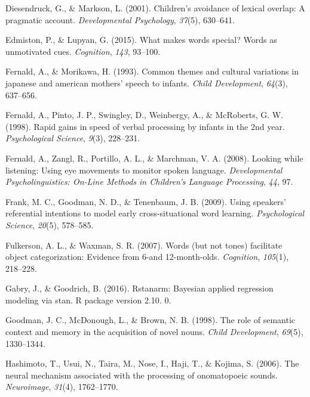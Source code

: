 \documentclass[english,floatsintext,man]{apa6}
\theoremstyle{definition}
\theoremstyle{definition}
\theoremstyle{definition}
\theoremstyle{remark}
\begin{document}
\leavevmode\hypertarget{ref-diesendruck2001children}{}%
Diesendruck, G., \& Markson, L. (2001). Children's avoidance of lexical
overlap: A pragmatic account. \emph{Developmental Psychology},
\emph{37}(5), 630--641.

\leavevmode\hypertarget{ref-edmiston2015makes}{}%
Edmiston, P., \& Lupyan, G. (2015). What makes words special? Words as
unmotivated cues. \emph{Cognition}, \emph{143}, 93--100.

\leavevmode\hypertarget{ref-fernald1993common}{}%
Fernald, A., \& Morikawa, H. (1993). Common themes and cultural
variations in japanese and american mothers' speech to infants.
\emph{Child Development}, \emph{64}(3), 637--656.

\leavevmode\hypertarget{ref-fernald1998rapid}{}%
Fernald, A., Pinto, J. P., Swingley, D., Weinbergy, A., \& McRoberts, G.
W. (1998). Rapid gains in speed of verbal processing by infants in the
2nd year. \emph{Psychological Science}, \emph{9}(3), 228--231.

\leavevmode\hypertarget{ref-fernald2008looking}{}%
Fernald, A., Zangl, R., Portillo, A. L., \& Marchman, V. A. (2008).
Looking while listening: Using eye movements to monitor spoken language.
\emph{Developmental Psycholinguistics: On-Line Methods in Children's
Language Processing}, \emph{44}, 97.

\leavevmode\hypertarget{ref-frank2009using}{}%
Frank, M. C., Goodman, N. D., \& Tenenbaum, J. B. (2009). Using
speakers' referential intentions to model early cross-situational word
learning. \emph{Psychological Science}, \emph{20}(5), 578--585.

\leavevmode\hypertarget{ref-fulkerson2007words}{}%
Fulkerson, A. L., \& Waxman, S. R. (2007). Words (but not tones)
facilitate object categorization: Evidence from 6-and 12-month-olds.
\emph{Cognition}, \emph{105}(1), 218--228.

\leavevmode\hypertarget{ref-gabry2016rstanarm}{}%
Gabry, J., \& Goodrich, B. (2016). Rstanarm: Bayesian applied regression
modeling via stan. R package version 2.10. 0.

\leavevmode\hypertarget{ref-goodman1998role}{}%
Goodman, J. C., McDonough, L., \& Brown, N. B. (1998). The role of
semantic context and memory in the acquisition of novel nouns.
\emph{Child Development}, \emph{69}(5), 1330--1344.

\leavevmode\hypertarget{ref-hashimoto2006neural}{}%
Hashimoto, T., Usui, N., Taira, M., Nose, I., Haji, T., \& Kojima, S.
(2006). The neural mechanism associated with the processing of
onomatopoeic sounds. \emph{Neuroimage}, \emph{31}(4), 1762--1770.
\end{document}
